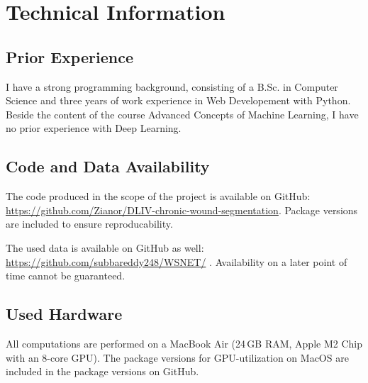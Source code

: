 \section{Technical Information}

\subsection{Prior Experience}

I have a strong programming background, consisting of a B.Sc. in Computer Science and three years of work experience in Web Developement with Python. Beside the content of the course Advanced Concepts of Machine Learning, I have no prior experience with Deep Learning.

\subsection{Code and Data Availability}

The code produced in the scope of the project is available on GitHub: \url{https://github.com/Zianor/DLIV-chronic-wound-segmentation}. Package versions are included to ensure reproducability.

The used data is available on GitHub as well: \url{https://github.com/subbareddy248/WSNET/} \cite{Oota_2021_WACV, Oota_2023_WACV}. Availability on a later point of time cannot be guaranteed.

\subsection{Used Hardware}

All computations are performed on a MacBook Air (24\,GB RAM, Apple M2 Chip with an 8-core GPU). The package versions for GPU-utilization on MacOS are included in the package versions on GitHub.

